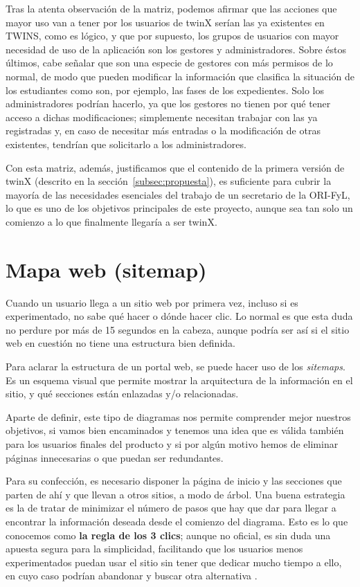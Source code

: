 Tras la atenta observación de la matriz, podemos afirmar que las acciones que mayor uso van a tener por los usuarios de twinX serían las ya existentes en TWINS, como es lógico, y que por supuesto, los grupos de usuarios con mayor necesidad de uso de la aplicación son los gestores y administradores. Sobre éstos últimos, cabe señalar que son una especie de gestores con más permisos de lo normal, de modo que pueden modificar la información que clasifica la situación de los estudiantes como son, por ejemplo, las fases de los expedientes. Solo los administradores podrían hacerlo, ya que los gestores no tienen por qué tener acceso a dichas modificaciones; simplemente necesitan trabajar con las ya registradas y, en caso de necesitar más entradas o la modificación de otras existentes, tendrían que solicitarlo a los administradores.

Con esta matriz, además, justificamos que el contenido de la primera versión de twinX (descrito en la sección~\ref{subsec:propuesta}), es suficiente para cubrir la mayoría de las necesidades esenciales del trabajo de un secretario de la ORI-FyL, lo que es uno de los objetivos principales de este proyecto, aunque sea tan solo un comienzo a lo que finalmente llegaría a ser twinX.

\section{Mapa web (sitemap)}

Cuando un usuario llega a un sitio web por primera vez, incluso si es experimentado, no sabe qué hacer o dónde hacer clic. Lo normal es que esta duda no perdure por más de 15 segundos en la cabeza, aunque podría ser así si el sitio web en cuestión no tiene una estructura bien definida.

Para aclarar la estructura de un portal web, se puede hacer uso de los \textit{sitemaps}. Es un esquema visual que permite mostrar la arquitectura de la información en el sitio, y qué secciones están enlazadas y/o relacionadas.

Aparte de definir, este tipo de diagramas nos permite comprender mejor nuestros objetivos, si vamos bien encaminados y tenemos una idea que es válida también para los usuarios finales del producto y si por algún motivo hemos de eliminar páginas innecesarias o que puedan ser redundantes.

Para su confección, es necesario disponer la página de inicio y las secciones que parten de ahí y que llevan a otros sitios, a modo de árbol. Una buena estrategia es la de tratar de minimizar el número de pasos que hay que dar para llegar a encontrar la información deseada desde el comienzo del diagrama. Esto es lo que conocemos como \textbf{la regla de los 3 clics}; aunque no oficial, es sin duda una apuesta segura para la simplicidad, facilitando que los usuarios menos experimentados puedan usar el sitio sin tener que dedicar mucho tiempo a ello, en cuyo caso podrían abandonar y buscar otra alternativa \cite{sitemap}.

